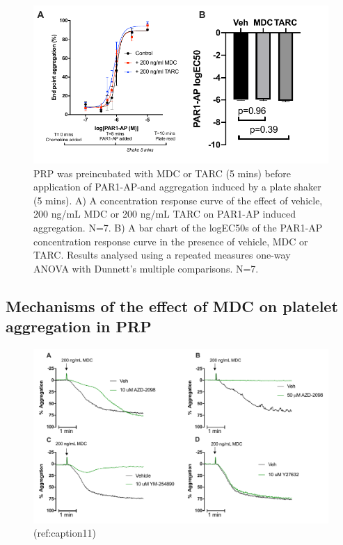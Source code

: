 \documentclass[11pt,twoside]{bristolthesis}
\begin{document}
\begin{figure}
\includegraphics{figure/Chemokines/Layouts/MDC_TARC_PRP_plate_agg} \caption[The priming effect of the chemokines MDC and TARC on PAR1-AP induced platelet aggregation in PRP using plate aggregation]{PRP was preincubated with MDC or TARC (5 mins) before application of PAR1-AP-and aggregation induced by a plate shaker (5 mins). A) A concentration response curve of the effect of vehicle, 200 ng/mL MDC or 200 ng/mL TARC on PAR1-AP induced aggregation. N=7. B) A bar chart of the logEC50s of the PAR1-AP concentration response curve in the presence of vehicle, MDC or TARC. Results analysed using a repeated measures one-way ANOVA with Dunnett's multiple comparisons. N=7.}\label{fig:MDC-TARC-agg-PRP}
\end{figure}
\hypertarget{mechanisms-of-the-effect-of-mdc-on-platelet-aggregation-in-prp}{%
\subsection{Mechanisms of the effect of MDC on platelet aggregation in PRP}\label{mechanisms-of-the-effect-of-mdc-on-platelet-aggregation-in-prp}}



\begin{figure}
\includegraphics{figure/Chemokines/Layouts/MDC_inhibitors_aggregation_traces} \caption[Example aggregation traces of the effect of inhibitors on MDC induced platelet aggregation in PRP.
(ref:caption11)]{(ref:caption11)}\label{fig:MDC-PRP-agg-trace}
\end{figure}
\end{document}
